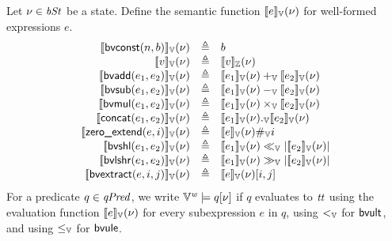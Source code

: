 Let $\nu \in \mathit{bSt}$ be a state.
Define the semantic function $[\![{e}]\!]_{\mathbb{V}}(\nu)$ for well-formed expressions $e$.
\[
\begin{array}{rcl}
\bvvalueof{\bvconst(n, b)}(\bvst) & \defn & b \\
\bvvalueof{v}(\bvst) & \defn & \zvalueof{v}(\bvst) \\
\bvvalueof{\bvadd(e_1, e_2)}(\bvst) & \defn & \bvvalueof{e_1}(\bvst) +_\BV \bvvalueof{e_2}(\bvst) \\
\bvvalueof{\bvsub(e_1, e_2)}(\bvst) & \defn & \bvvalueof{e_1}(\bvst) -_\BV \bvvalueof{e_2}(\bvst) \\
\bvvalueof{\bvmul(e_1, e_2)}(\bvst) & \defn & \bvvalueof{e_1}(\bvst) \times_\BV \bvvalueof{e_2}(\bvst) \\
\bvvalueof{\bvconcat(e_1, e_2)}(\bvst) & \defn & \bvvalueof{e_1}(\bvst) ._\BV \bvvalueof{e_2}(\bvst) \\
\bvvalueof{\bvext(e, i)}(\bvst) & \defn & \bvvalueof{e}(\bvst) \#_\BV i \\
\bvvalueof{\bvshl(e_1, e_2)}(\bvst) & \defn & \bvvalueof{e_1}(\bvst) \ll_\BV |\bvvalueof{e_2}(\bvst)| \\
\bvvalueof{\bvlshr(e_1, e_2)}(\bvst) & \defn & \bvvalueof{e_1}(\bvst) \gg_\BV |\bvvalueof{e_2}(\bvst)| \\
\bvvalueof{\bvextract(e, i, j)}(\bvst) & \defn & \bvvalueof{e}(\bvst)[i, j] \\
\end{array}
\]
For a predicate $q \in \mathit{qPred}$, we write $\mathbb{V}^{\mathit{w}} \models q[\nu]$ if $q$ evaluates to $\mathit{tt}$ using the evaluation function $[\![{e}]\!]_{\mathbb{V}}(\nu)$ for every subexpression $e$ in $q$, using $<_{\mathbb{V}}$ for $\mbox{\textsf{bvult}}$, and using $\leq_{\mathbb{V}}$ for $\mbox{\textsf{bvule}}$.

